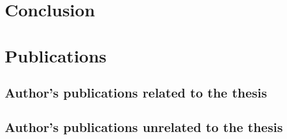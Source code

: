 \documentclass[11pt]{article}
\begin{document}
\section{Conclusion}
\label{sec:conclusion}


\section{Publications}
\label{sec:publications}\nocite{*}

\subsection*{Author's publications related to the thesis}
\printbibliography[keyword=related,heading=none]

\subsection*{Author's publications unrelated to the thesis}
\printbibliography[keyword=unrelated,heading=none]

\printbibliography[keyword=foreign]
\end{document}
